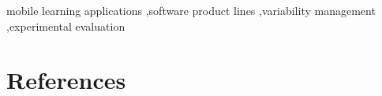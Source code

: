 \documentclass[preprint,12pt]{elsarticle}
\begin{document}
\begin{frontmatter}
\begin{keyword}
mobile learning applications \sep software product lines \sep variability management \sep experimental evaluation



\end{keyword}

\end{frontmatter}






















\section*{References}
\end{document}

